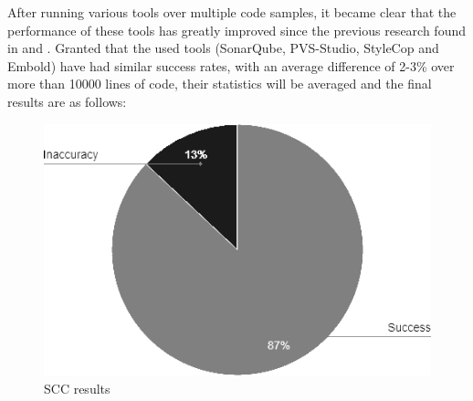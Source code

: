 After running various tools over multiple code samples, it became clear that the performance of these tools has greatly improved since the previous research found in \cite{cuoq2012benchmarking} and \cite{herter2019benchmarking}. Granted that the used tools (SonarQube, PVS-Studio, StyleCop and Embold) have had similar success rates, with an average difference of 2-3\% over more than 10000 lines of code, their statistics will be averaged and the final results are as follows:

\begin{figure}[H]
    \caption{SCC results}
    \label{SCC results}
    \centering
    \includegraphics[scale=0.9]{./Images/SCC Results.png}
\end{figure}